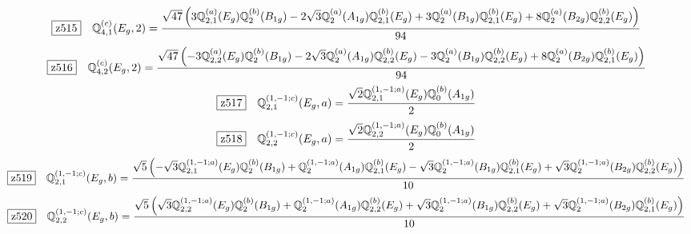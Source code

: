 \documentclass[fleqn,10pt,landscape]{jsarticle}
\begin{document}
\begin{dmath*}
\hspace*{3mm}\fbox{z515}\quad \mathbb{Q}_{4,1}^{(c)}(E_{g},2)=\frac{\sqrt{47} \left(3 \mathbb{Q}_{2,1}^{(a)}(E_{g}) \mathbb{Q}_{2}^{(b)}(B_{1g}) - 2 \sqrt{3} \mathbb{Q}_{2}^{(a)}(A_{1g}) \mathbb{Q}_{2,1}^{(b)}(E_{g}) + 3 \mathbb{Q}_{2}^{(a)}(B_{1g}) \mathbb{Q}_{2,1}^{(b)}(E_{g}) + 8 \mathbb{Q}_{2}^{(a)}(B_{2g}) \mathbb{Q}_{2,2}^{(b)}(E_{g})\right)}{94}
\end{dmath*}
\begin{dmath*}
\hspace*{3mm}\fbox{z516}\quad \mathbb{Q}_{4,2}^{(c)}(E_{g},2)=\frac{\sqrt{47} \left(- 3 \mathbb{Q}_{2,2}^{(a)}(E_{g}) \mathbb{Q}_{2}^{(b)}(B_{1g}) - 2 \sqrt{3} \mathbb{Q}_{2}^{(a)}(A_{1g}) \mathbb{Q}_{2,2}^{(b)}(E_{g}) - 3 \mathbb{Q}_{2}^{(a)}(B_{1g}) \mathbb{Q}_{2,2}^{(b)}(E_{g}) + 8 \mathbb{Q}_{2}^{(a)}(B_{2g}) \mathbb{Q}_{2,1}^{(b)}(E_{g})\right)}{94}
\end{dmath*}
\begin{dmath*}
\hspace*{3mm}\fbox{z517}\quad \mathbb{Q}_{2,1}^{(1,-1;c)}(E_{g},a)=\frac{\sqrt{2} \mathbb{Q}_{2,1}^{(1,-1;a)}(E_{g}) \mathbb{Q}_{0}^{(b)}(A_{1g})}{2}
\end{dmath*}
\begin{dmath*}
\hspace*{3mm}\fbox{z518}\quad \mathbb{Q}_{2,2}^{(1,-1;c)}(E_{g},a)=\frac{\sqrt{2} \mathbb{Q}_{2,2}^{(1,-1;a)}(E_{g}) \mathbb{Q}_{0}^{(b)}(A_{1g})}{2}
\end{dmath*}
\begin{dmath*}
\hspace*{3mm}\fbox{z519}\quad \mathbb{Q}_{2,1}^{(1,-1;c)}(E_{g},b)=\frac{\sqrt{5} \left(- \sqrt{3} \mathbb{Q}_{2,1}^{(1,-1;a)}(E_{g}) \mathbb{Q}_{2}^{(b)}(B_{1g}) + \mathbb{Q}_{2}^{(1,-1;a)}(A_{1g}) \mathbb{Q}_{2,1}^{(b)}(E_{g}) - \sqrt{3} \mathbb{Q}_{2}^{(1,-1;a)}(B_{1g}) \mathbb{Q}_{2,1}^{(b)}(E_{g}) + \sqrt{3} \mathbb{Q}_{2}^{(1,-1;a)}(B_{2g}) \mathbb{Q}_{2,2}^{(b)}(E_{g})\right)}{10}
\end{dmath*}
\begin{dmath*}
\hspace*{3mm}\fbox{z520}\quad \mathbb{Q}_{2,2}^{(1,-1;c)}(E_{g},b)=\frac{\sqrt{5} \left(\sqrt{3} \mathbb{Q}_{2,2}^{(1,-1;a)}(E_{g}) \mathbb{Q}_{2}^{(b)}(B_{1g}) + \mathbb{Q}_{2}^{(1,-1;a)}(A_{1g}) \mathbb{Q}_{2,2}^{(b)}(E_{g}) + \sqrt{3} \mathbb{Q}_{2}^{(1,-1;a)}(B_{1g}) \mathbb{Q}_{2,2}^{(b)}(E_{g}) + \sqrt{3} \mathbb{Q}_{2}^{(1,-1;a)}(B_{2g}) \mathbb{Q}_{2,1}^{(b)}(E_{g})\right)}{10}
\end{dmath*}
\end{document}
